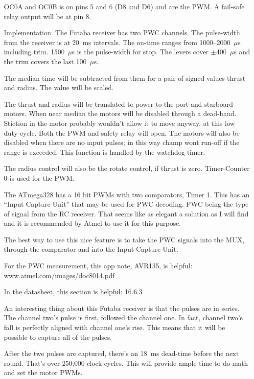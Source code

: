 OC0A and OC0B is on pins 5 and 6  (D8 and D6) and are the PWM.
A fail-safe relay output will be at pin 8.

\fi

Implementation.
The Futaba receiver has two PWC channels.
The pulse-width from the receiver is at 20~ms intervals.
The on-time ranges from 1000--2000~$\mu$s including trim.
1500~$\mu$s is the pulse-width for stop.
The levers cover $\pm$400~$\mu$s and the trim covers the last 100~$\mu$s.

The median time will be subtracted from them for a pair of signed values
thrust and radius. The value will be scaled.

The thrust and radius will be translated to power to the
port and starboard motors.
When near median the motors will be disabled through a dead-band.
Stiction in the motor probably wouldn't allow it to move anyway, at this low
duty-cycle. Both the PWM and safety relay will open.
The motors will also be disabled when there are no input pulses; in this way
champ wont run-off if the range is exceeded. This function is handled by the
watchdog timer.

The radius control will also be the rotate control, if thrust is zero.
Timer-Counter 0 is used for the PWM.

The ATmega328 has a 16 bit PWMs with two comparators, Timer 1.
This has an ``Input Capture Unit'' that may be used for PWC decoding.
PWC being the type of signal from the RC receiver.
That seems like as elegant a solution as I will find and it is recommended by
Atmel to use it for this purpose.

The best way to use this nice feature is to
take the PWC signals into the MUX, through the comparator and into the Input
Capture Unit.

For the PWC measurement, this app note, AVR135, is helpful:
www.atmel.com/images/doc8014.pdf


In the datasheet, this section is helpful: 16.6.3

An interesting thing about this Futaba receiver is that the pulses are in
series.
The channel two's pulse is first, followed the channel one.
In fact, channel two's fall is perfectly aligned with channel one's rise.
This means that it will be possible to capture all of the pulses.

After the two pulses are captured, there's an 18~ms dead-time before the next
round. That's over 250,000 clock cycles.
This will provide ample time to do math and set the motor PWMs.


